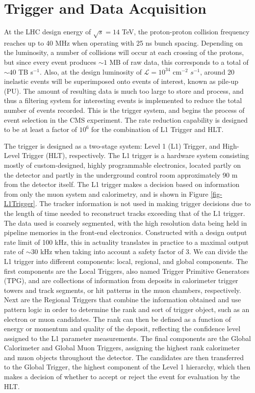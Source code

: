 \section{Trigger and Data Acquisition} \label{sec-Trigger}

At the LHC design energy of $\sqrt{s}=14$ TeV, the proton-proton collision frequency reaches up to 40 MHz when operating with 25 ns bunch spacing. Depending on the luminosity, a number of collisions will occur at each crossing of the protons, but since every event produces $\sim1$ MB of raw data, this corresponds to a total of $\sim 40$ TB s$^{-1}$. Also, at the design luminosity of $\mathcal{L} = 10^{34}$ cm$^{-2}$ $s^{-1}$, around 20 inelastic events will be superimposed onto events of interest, known as pile-up (PU). The amount of resulting data is much too large to store and process, and thus a filtering system for interesting events is implemented to reduce the total number of events recorded. This is the trigger system, and begins the process of event selection in the CMS experiment. The rate reduction capability is designed to be at least a factor of $10^6$ for the combination of L1 Trigger and HLT.

The trigger is designed as a two-stage system: Level 1 (L1) Trigger, and High-Level Trigger (HLT), respectively. The L1 trigger is a hardware system consisting mostly of custom-designed, highly programmable electronics, located partly on the detector and partly in the underground control room approximately 90 m from the detector itself. The L1 trigger makes a decision based on information from only the muon system and calorimetry, and is shown in Figure \ref{fig-L1Trigger}. The tracker information is not used in making trigger decisions due to the length of time needed to reconstruct tracks exceeding that of the L1 trigger. The data used is coarsely segmented, with the high resolution data being held in pipeline memories in the front-end electronics. Constructed with a design output rate limit of 100 kHz, this in actuality translates in practice to a maximal output rate of $\sim30$ kHz when taking into account a safety factor of 3. We can divide the L1 trigger into different components: local, regional, and global components. The first components are the Local Triggers, also named Trigger Primitive Generators (TPG), and are collections of information from deposits in calorimeter trigger towers and track segments, or hit patterns in the muon chambers, respectively. Next are the Regional Triggers that combine the information obtained and use pattern logic in order to determine the rank and sort of trigger object, such as an electron or muon candidates. The rank can then be defined as a function of energy or momentum and quality of the deposit, reflecting the confidence level assigned to the L1 parameter measurements. The final components are the Global Calorimeter and Global Muon Triggers, assigning the highest rank calorimeter and muon objects throughout the detector. The candidates are then transferred to the Global Trigger, the highest component of the Level 1 hierarchy, which then makes a decision of whether to accept or reject the event for evaluation by the HLT. 


